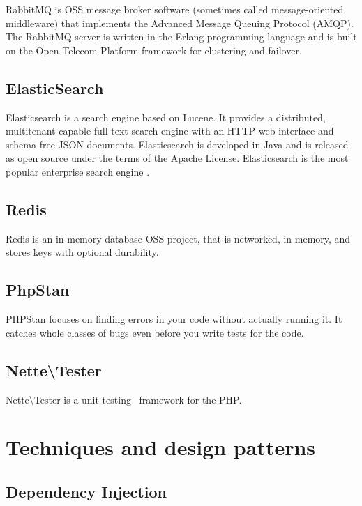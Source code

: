 RabbitMQ is OSS message broker software (sometimes called message-oriented middleware) that implements the Advanced Message Queuing Protocol (AMQP). The RabbitMQ server is written in the Erlang programming language and is built on the Open Telecom Platform framework for clustering and failover.~\cite{wiki:rabbitmq}

\subsection{ElasticSearch} \label{sec:theory:elasticsearch}

Elasticsearch is a search engine based on Lucene. It provides a distributed, multitenant-capable full-text search engine with an HTTP web interface and schema-free JSON documents. Elasticsearch is developed in Java and is released as open source under the terms of the Apache License. Elasticsearch is the most popular enterprise search engine .~\cite{wiki:elasticsearch}

\subsection{Redis} \label{sec:theory:redis}

Redis is an in-memory database OSS project, that is networked, in-memory, and stores keys with optional durability.~\cite{wiki:redis}

\subsection{PhpStan} \label{sec:theory:phpstan}

PHPStan focuses on finding errors in your code without actually running it. It catches whole classes of bugs even before you write tests for the code.~\cite{github:phpstan}

\subsection{Nette\textbackslash{}Tester} \label{sec:theory:nette-tester}

Nette\textbackslash{}Tester is a unit testing~\cite{wiki:unit-testing} framework for the PHP.~\cite{tester:docs}

\section{Techniques and design patterns}

\subsection{Dependency Injection} \label{sec:theory:di}

